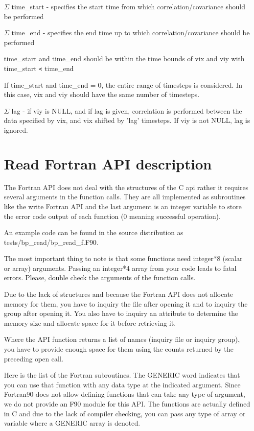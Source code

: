 \ensuremath{\Sigma} time\_start - specifies the start time from which correlation/covariance 
should be performed

\ensuremath{\Sigma} time\_end - specifies the end time up to which correlation/covariance 
should be performed

\leftskip=36pt
time\_start and time\_end should be within the time bounds of vix and viy with 
time\_start \texttt{<} time\_end

If time\_start and time\_end = 0, the entire range of timesteps is considered. 
In this case, vix and viy should have the same number of timesteps.

\leftskip=0pt
\ensuremath{\Sigma} lag - if viy is NULL, and if lag is given, correlation is performed 
between the data specified by vix, and vix shifted by 'lag' timesteps.  If viy 
is not NULL, lag is ignored.\label{HRef144348794}\label{HRef144348801}\label{HToc182553413}

\section{Read Fortran API description}

The Fortran API does not deal with the structures of the C api rather it requires 
several arguments in the function calls.  They are all implemented as subroutines 
like the write Fortran API and the last argument is an integer variable to store 
the error code output of each function (0 meaning successful operation). 

An example code can be found in the source distribution as tests/bp\_read/bp\_read\_f.F90.

The most important thing to note is that some functions need integer*8 (scalar 
or array) arguments. Passing an integer*4 array from your code leads to fatal errors. 
Please, double check the arguments of the function calls. 

Due to the lack of structures and because the Fortran API does not allocate memory 
for them, you have to inquiry the file after opening it and to inquiry the group 
after opening it. You also have to inquiry an attribute to determine the memory 
size and allocate space for it before retrieving it. 

Where the API function returns a list of names (inquiry file or inquiry group), 
you have to provide enough space for them using the counts returned by the preceding 
open call. 

Here is the list of the Fortran subroutines. The GENERIC word indicates that you 
can use that function with any data type at the indicated argument. Since Fortran90 
does not allow defining functions that can take any type of argument, we do not 
provide an F90 module for this API. The functions are actually defined in C and 
due to the lack of compiler checking, you can pass any type of array or variable 
where a GENERIC array is denoted. 

